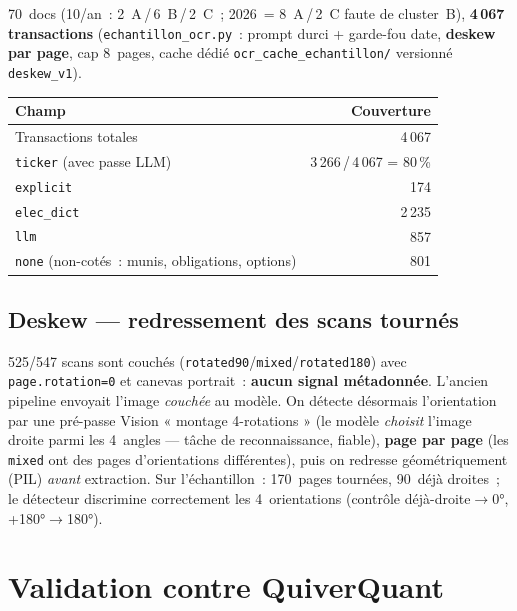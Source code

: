 \documentclass[11pt,a4paper]{article}
\newcommand{\file}[1]{\texttt{\small #1}}
\begin{document}
70~docs (10/an~: 2~A\,/\,6~B\,/\,2~C~; 2026~= 8~A\,/\,2~C faute de cluster~B),
\textbf{4\,067 transactions} (\file{echantillon\_ocr.py}~: prompt durci + garde-fou date,
\textbf{deskew par page}, cap 8~pages, cache dédié \file{ocr\_cache\_echantillon/} versionné
\texttt{deskew\_v1}).

\begin{center}
\begin{tabular}{@{}l r@{}}
\toprule
\textbf{Champ} & \textbf{Couverture} \\
\midrule
Transactions totales & 4\,067 \\
\texttt{ticker} (avec passe LLM) & 3\,266\,/\,4\,067 = 80\,\% \\
\quad \texttt{explicit} & 174 \\
\quad \texttt{elec\_dict} & 2\,235 \\
\quad \texttt{llm} & 857 \\
\quad \texttt{none} (non-cotés~: munis, obligations, options) & 801 \\
\bottomrule
\end{tabular}
\end{center}

\subsection*{Deskew --- redressement des scans tournés}

525/547 scans sont couchés (\texttt{rotated90}/\texttt{mixed}/\texttt{rotated180}) avec
\texttt{page.rotation=0} et canevas portrait~: \textbf{aucun signal métadonnée}. L'ancien
pipeline envoyait l'image \emph{couchée} au modèle. On détecte désormais l'orientation par
une pré-passe Vision « montage 4-rotations » (le modèle \emph{choisit} l'image droite parmi
les 4~angles --- tâche de reconnaissance, fiable), \textbf{page par page} (les \texttt{mixed}
ont des pages d'orientations différentes), puis on redresse géométriquement (PIL) \emph{avant}
extraction. Sur l'échantillon~: 170~pages tournées, 90~déjà droites~; le détecteur discrimine
correctement les 4~orientations (contrôle déjà-droite$\to$0°, +180°$\to$180°).

\section{Validation contre QuiverQuant}
\end{document}
